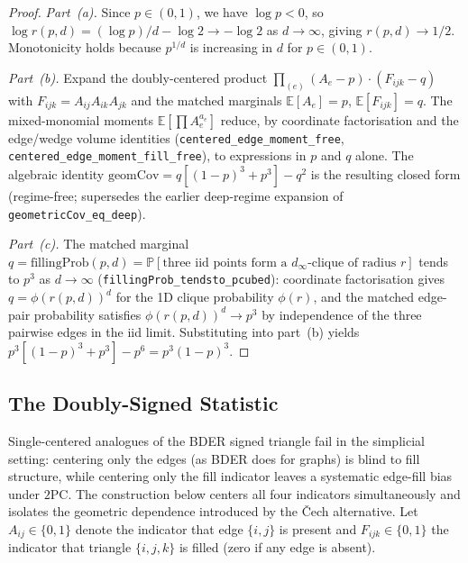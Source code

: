 \documentclass[reqno,12pt]{amsart}
\newcommand{\PC}{\mathrm{2PC}}
\newcommand{\geomCov}{\mathrm{geomCov}}
\newcommand{\fillingP}{\mathrm{fillingProb}}
\newcommand{\EE}{\mathbb{E}}
\newcommand{\PP}{\mathbb{P}}
\newcommand{\lean}[1]{\textup{\texttt{\small #1}}}
\theoremstyle{plain}
\theoremstyle{definition}
\theoremstyle{remark}
\begin{document}
\begin{proof}
\textit{Part~(a).} Since $p\in(0,1)$, we have $\log p < 0$, so
$\log r(p,d) = (\log p)/d - \log 2 \to -\log 2$ as $d\to\infty$, giving $r(p,d)\to 1/2$.
Monotonicity holds because $p^{1/d}$ is increasing in $d$ for $p\in(0,1)$.

\textit{Part~(b).} Expand the doubly-centered product
$\prod_{(e)}(A_e - p)\cdot(F_{ijk} - q)$ with $F_{ijk} = A_{ij} A_{ik} A_{jk}$ and the
matched marginals $\EE[A_e] = p$, $\EE[F_{ijk}] = q$. The mixed-monomial moments
$\EE[\prod A_e^{a_e}]$ reduce, by coordinate factorisation and the edge/wedge
volume identities (\lean{centered\_edge\_moment\_free},
\lean{centered\_edge\_moment\_fill\_free}), to expressions in $p$ and $q$ alone. The
algebraic identity $\geomCov = q[(1-p)^3 + p^3] - q^2$ is the resulting closed form
(regime-free; supersedes the earlier deep-regime expansion of
\lean{geometricCov\_eq\_deep}).

\textit{Part~(c).} The matched marginal $q = \fillingP(p,d) = \PP[\text{three iid}
\text{ points form a }d_\infty\text{-clique of radius }r]$ tends to $p^3$ as
$d \to \infty$ (\lean{fillingProb\_tendsto\_pcubed}): coordinate factorisation gives
$q = \phi(r(p,d))^d$ for the 1D clique probability $\phi(r)$, and the matched edge-pair
probability satisfies $\phi(r(p,d))^d \to p^3$ by independence of the three pairwise
edges in the iid limit. Substituting into part~(b) yields
$p^3[(1-p)^3 + p^3] - p^6 = p^3 (1-p)^3$. \qedhere
\end{proof}

\subsection{The Doubly-Signed Statistic}\label{sec:statistic}\label{sec:linfty-statistic}

Single-centered analogues of the BDER signed triangle fail in the simplicial setting:
centering only the edges (as BDER does for graphs) is blind to fill structure, while
centering only the fill indicator leaves a systematic edge-fill bias under
$\PC$. The construction below centers all four indicators simultaneously and isolates the
geometric dependence introduced by the \v{C}ech alternative. Let $A_{ij} \in \{0, 1\}$
denote the indicator that edge $\{i, j\}$ is present and $F_{ijk} \in \{0, 1\}$ the
indicator that triangle $\{i, j, k\}$ is filled (zero if any edge is absent).
\end{document}
